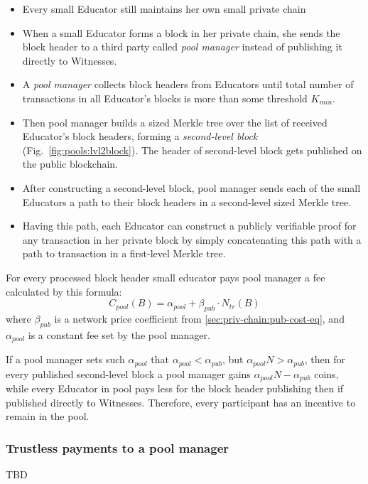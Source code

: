 \begin{itemize}
\item Every small Educator still maintains her own small private chain
\item When a small Educator forms a block in her private chain, she sends the
  block header to a third party called \textit{pool manager} instead of
  publishing it directly to Witnesses.
\item A \textit{pool manager} collects block headers from Educators until
  total number of transactions in all Educator's blocks is more than some
  threshold $K_{min}$.
\item Then pool manager builds a sized Merkle tree over the list of received
  Educator's block headers, forming a \textit{second-level block}
  (Fig.~\ref{fig:pools:lvl2block}). The header of second-level block gets published
  on the public blockchain.
\item After constructing a second-level block, pool manager sends each of the
  small Educators a path to their block headers in a second-level sized Merkle tree.
\item Having this path, each Educator can construct a publicly verifiable proof
  for any transaction in her private block by simply concatenating this path
  with a path to transaction in a first-level Merkle tree.
\end{itemize}

For every processed block header small educator pays pool manager a fee
calculated by this formula:
\begin{equation}\label{apx:pools:pools-cost-eq}
  C_{pool}(B) = \alpha_{pool} + \beta_{pub} \cdot N_{tr}(B)
\end{equation}
where $\beta_{pub}$ is a network price coefficient from
\ref{sec:priv-chain:pub-cost-eq}, and $\alpha_{pool}$ is a constant fee set by
the pool manager.

If a pool manager sets such $\alpha_{pool}$ that
$\alpha_{pool} < \alpha_{pub}$, but $\alpha_{pool} N > \alpha_{pub}$, then for
every published second-level block a pool manager gains
$\alpha_{pool} N - \alpha_{pub}$ coins, while every Educator in pool pays less
for the block header publishing then if published directly to Witnesses.
Therefore, every participant has an incentive to remain in the pool.

\subsubsection{Trustless payments to a pool manager}

TBD
